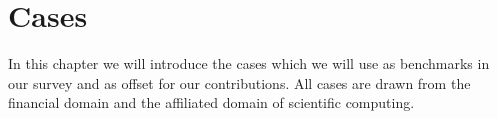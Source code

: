 \chapter{Cases}
\label{chap:cases}

In this chapter we will introduce the cases which we will use as
benchmarks in our survey and as offset for our contributions. All
cases are drawn from the financial domain and the affiliated domain of
scientific computing.






